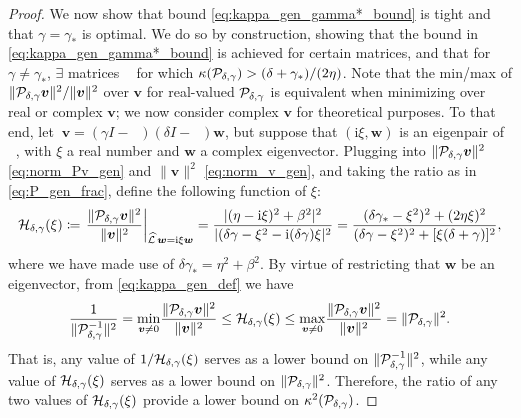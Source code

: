 \documentclass[review]{siamart}
\DeclareMathOperator{\cL}{\widehat{\mathcal{L}}}
\begin{document}
\begin{proof}
We now show that bound \eqref{eq:kappa_gen_gamma*_bound} is tight and that
$\gamma = \gamma_*$ is optimal. We do so by construction, showing that the
bound in \eqref{eq:kappa_gen_gamma*_bound} is achieved for certain matrices, and 
that for $\gamma\neq\gamma_*$, $\exists$ matrices $\cL$ for which
$\kappa({\cal P}_{\delta, \gamma}) > (\delta + \gamma_*)/(2\eta)$. Note that the min/max 
of $\Vert {\cal P}_{\delta,\gamma} \bm{v} \Vert^2/\Vert \bm{v} \Vert^2$ over $\bm{v}$
for real-valued ${\cal P}_{\delta,\gamma}$ is equivalent when minimizing over real
or complex $\bm{v}$; we now consider complex $\bm{v}$ for theoretical
purposes. To that end, let $~\bm{v}=(\gamma I - \cL)(\delta I - \cL) \bm{w}$, but 
suppose that $(\textrm{i} \xi, \bm{w})$ is an eigenpair of $\cL$, with $\xi$
a real number and $\bm{w}$ a complex eigenvector. Plugging into
$\| {\cal P}_{\delta,\gamma} \bm{v}\|^2$ \eqref{eq:norm_Pv_gen} and $\|\bm{v}\|^2$
\eqref{eq:norm_v_gen}, and taking the ratio as in \eqref{eq:P_gen_frac},
define the following function of $\xi$:
%
\begin{align} \label{eq:H_gen_def}
{\cal H}_{\delta,\gamma}(\xi) 
\coloneqq 
\left. \frac{\Vert {\cal P}_{\delta, \gamma} \bm{v} \Vert^2 }{\Vert \bm{v} \Vert^2} \right|_{\cL \bm{w} = \mathrm{i} \xi \bm{w}}
=
\frac{|(\eta- \mathrm{i} \xi)^2 + \beta^2|^2}{|(\delta \gamma - \xi^2 - \mathrm{i} (\delta \gamma) \xi|^2}
=
\frac{(\delta \gamma_* - \xi^2)^2 + (2 \eta \xi)^2}{(\delta \gamma-\xi^2)^2 + [\xi ( \delta + \gamma) ]^2},
\end{align}
where we have made use of $\delta \gamma_* = \eta^2 + \beta^2$.
By virtue of restricting that $\bm{w}$ be an eigenvector, from \eqref{eq:kappa_gen_def} we have
\begin{align}
\label{eq:H_gen_bounds}
\frac{1}{\Vert {\cal P}_{\delta,\gamma}^{-1} \Vert^2}
=
\underset{\bm{v} \neq 0}{\min} \frac{\Vert {\cal P}_{\delta,\gamma} \bm{v} \Vert^2}{\Vert \bm{v} \Vert^2}
\leq {\cal H}_{\delta,\gamma}(\xi) \leq 
\underset{\bm{v} \neq 0}{\max} \frac{\Vert {\cal P}_{\delta,\gamma} \bm{v} \Vert^2}{\Vert \bm{v} \Vert^2} = \Vert {\cal P}_{\delta,\gamma} \Vert^2.
\end{align}
%
That is, any value of $1/{\cal H}_{\delta,\gamma}(\xi)$ serves as a lower bound on
$\Vert {\cal P}_{\delta,\gamma}^{-1} \Vert^2$, while any value of ${\cal
H}_{\delta,\gamma}(\xi)$ serves as a lower bound on $\Vert {\cal P}_{\delta,\gamma} \Vert^2$.
Therefore, the ratio of any two values of ${\cal H}_{\delta,\gamma}(\xi)$ provide a
lower bound on $\kappa^2({\cal P}_{\delta,\gamma})$.


\end{proof}
\end{document}

